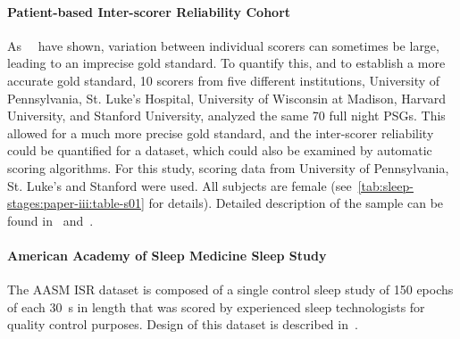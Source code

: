 \paragraph{Patient-based Inter-scorer Reliability Cohort}
As~\citeauthor{Rosenberg2013}~\cite{Rosenberg2013} have shown, variation between individual scorers can sometimes be large, leading to an imprecise gold standard.
To quantify this, and to establish a more accurate gold standard, 10 scorers from five different institutions, University of Pennsylvania, St. Luke’s Hospital, University of Wisconsin at Madison, Harvard University, and Stanford University, analyzed the same 70 full night \acp{PSG}.
This allowed for a much more precise gold standard, and the inter-scorer reliability could be quantified for a dataset, which could also be examined by automatic scoring algorithms.
For this study, scoring data from University of Pennsylvania, St. Luke’s and Stanford were used.
All subjects are female (see~\cref{tab:sleep-stages:paper-iii:table-s01} for details).
Detailed description of the sample can be found in~\cite{Kuna2013} and~\cite{Malhotra2014}.

\paragraph{American Academy of Sleep Medicine Sleep Study}
The \ac{AASM} ISR dataset is composed of a single control sleep study of 150 epochs of each \SI{30}{\second} in length that was scored by  experienced sleep technologists for quality control purposes.
Design of this dataset is described in~\cite{Rosenberg2013}.

